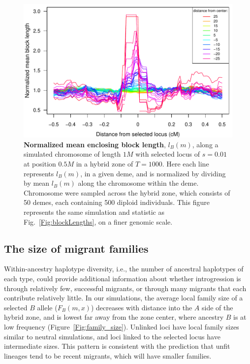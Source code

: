 \documentclass[11pt,letterpaper]{article}
\begin{document}
\begin{figure}
\includegraphics{figs/blocksAlongChromAncBConditioningHighRes.pdf}
\caption{\textbf{Normalized mean enclosing block length}, $l_B(m)$, along a simulated chromosome of length $1M$ with selected locus of $s=0.01$ at position $0.5M$ in a hybrid zone of $T=1000$. Here each line represents  $l_B(m)$, in a given deme, and is normalized by dividing by mean $l_B(m)$ along the chromosome within the deme. Chromosome were sampled across the hybrid zone, which consists of 50 demes, each containing 500 diploid individuals. This figure represents the same simulation and statistic as Fig.~\ref{Fig:blockLengths}, on a finer genomic scale.
}\label{Fig:blockLengthsZoom}
\end{figure}


\subsection*{The size of migrant families}

Within-ancestry haplotype diversity, i.e., the number of ancestral haplotypes of each type,
could provide additional information about whether introgression is through relatively few, successful migrants, 
or through many migrants that each contribute relatively little. 
In our simulations, the average local family size of a selected $B$ allele ($F_B(m,x)$) decreases with distance into the $A$ side of the hybrid zone, 
and is lowest far away from the zone center, where ancestry $B$ is at low frequency (Figure~\ref{Fig:family_size}). 
Unlinked loci have local family sizes similar to neutral simulations,
and loci linked to the selected locus have intermediate sizes.
This pattern is consistent with the prediction 
that unfit lineages tend to be recent migrants,
which will have smaller families.  
\end{document}
